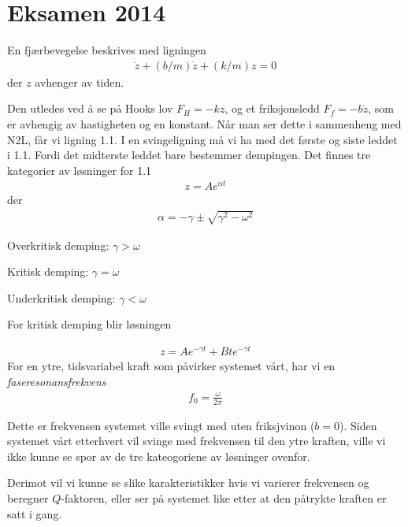 \documentclass[12pt]{article}
\numberwithin{equation}{section}
\numberwithin{figure}{section}
\newcommand{\ita}[1]{\textit{#1}}
\newcommand{\ma}[1]{$#1$}
\newcommand{\eq}[1]{{\small\begin{align}#1\end{align}}}
\begin{document}

\section{Eksamen 2014}
\begin{tcolorbox}[title = Kinematikk]
  En fjærbevegelse beskrives med ligningen 
  \eq{\ddot z + (b/m)\dot z + (k/m)z = 0} 
  der $z$ avhenger av tiden.
  
  Den utledes ved å se på Hooks lov $F_H = -kz$, og et friksjonsledd
  $F_f = -b\dot z$, som er avhengig av hastigheten og en konstant.
  Når man ser dette i sammenheng med N2L, får vi ligning 1.1.
  \tcbline
  I en svingeligning må vi ha med det første og siste leddet i 1.1.
  Fordi det midterste leddet bare bestemmer dempingen.
  \tcbline
  Det finnes tre kategorier av løsninger for 1.1
  \eq{z = A e^{\alpha t}}
  der
  \eq{\alpha = -\gamma \pm \sqrt{\gamma^2 - \omega^2}}
  
  Overkritisk demping: $\gamma > \omega$
  
  Kritisk demping: $\gamma = \omega$
  
  Underkritisk demping: $\gamma < \omega$
  
  For kritisk demping blir løsningen
  
  \eq{z = Ae^{-\gamma t} + Bte^{-\gamma t}}
  \tcbline
  For en ytre, tidsvariabel kraft som påvirker systemet vårt,
  har vi en \ita{faseresonansfrekvens}
  \eq{f_0 = \frac{\omega}{2\pi}}
  
  Dette er frekvensen systemet ville svingt med uten friksjvinon ($b=0$).
  \tcbline
  Siden systemet vårt etterhvert vil svinge med frekvensen til den ytre kraften,
  ville vi ikke kunne se spor av de tre kateogoriene av løsninger ovenfor.
  
  Derimot vil vi kunne se slike karakteristikker hvis vi varierer frekvensen
  og beregner \ma Q-faktoren, eller ser på systemet like etter at den påtrykte kraften 
  er satt i gang.
\end{tcolorbox}
\end{document}
